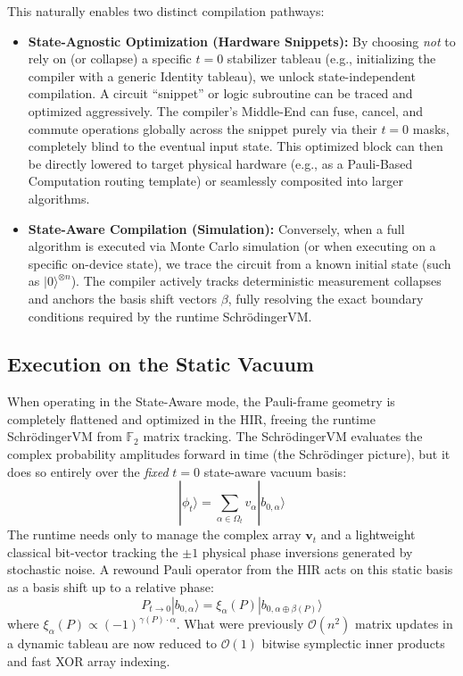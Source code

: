 \documentclass[aps,prx,reprint,superscriptaddress,nofootinbib]{revtex4-2}
\theoremstyle{definition}
\newcommand{\svm}{Schr\"odingerVM}
\begin{document}
This naturally enables two distinct compilation pathways:
\begin{itemize}[leftmargin=*]
    \item \textbf{State-Agnostic Optimization (Hardware Snippets):} By choosing \textit{not} to rely on (or collapse) a specific $t=0$ stabilizer tableau (e.g., initializing the compiler with a generic Identity tableau), we unlock state-independent compilation. A circuit ``snippet'' or logic subroutine can be traced and optimized aggressively. The compiler's Middle-End can fuse, cancel, and commute operations globally across the snippet purely via their $t=0$ masks, completely blind to the eventual input state. This optimized block can then be directly lowered to target physical hardware (e.g., as a Pauli-Based Computation routing template) or seamlessly composited into larger algorithms.

    \item \textbf{State-Aware Compilation (Simulation):} Conversely, when a full algorithm is executed via Monte Carlo simulation (or when executing on a specific on-device state), we trace the circuit from a known initial state (such as $|0\rangle^{\otimes n}$). The compiler actively tracks deterministic measurement collapses and anchors the basis shift vectors $\beta$, fully resolving the exact boundary conditions required by the runtime \svm.
\end{itemize}

\subsection{Execution on the Static Vacuum}

When operating in the State-Aware mode, the Pauli-frame geometry is completely flattened and optimized in the HIR, freeing the runtime \svm{} from $\mathbb{F}_2$ matrix tracking. The \svm{} evaluates the complex probability amplitudes forward in time (the Schr\"odinger picture), but it does so entirely over the \textit{fixed} $t=0$ state-aware vacuum basis:
\begin{equation}
    |\phi_t\rangle = \sum_{\alpha \in \Omega_t} v_\alpha |b_{0,\alpha}\rangle
\end{equation}
The runtime needs only to manage the complex array $\mathbf{v}_t$ and a lightweight classical bit-vector tracking the $\pm 1$ physical phase inversions generated by stochastic noise. A rewound Pauli operator from the HIR acts on this static basis as a basis shift up to a relative phase:
\begin{equation}
    P_{t \to 0} |b_{0,\alpha}\rangle = \xi_\alpha(P) |b_{0,\alpha \oplus \beta(P)}\rangle
\end{equation}
where $\xi_\alpha(P) \propto (-1)^{\gamma(P) \cdot \alpha}$. What were previously $\mathcal{O}(n^2)$ matrix updates in a dynamic tableau are now reduced to $\mathcal{O}(1)$ bitwise symplectic inner products and fast XOR array indexing.
\end{document}
